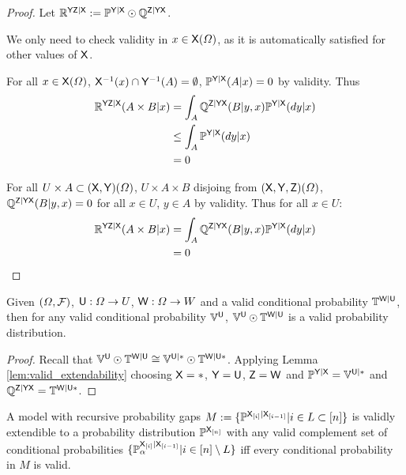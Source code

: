 \begin{proof}
Let $\mathbb{R}^{\mathsf{YZ}|\mathsf{X}}:=\mathbb{P}^{\mathsf{Y}|\mathsf{X}}\odot \mathbb{Q}^{\mathsf{Z}|\mathsf{Y}\mathsf{X}}$.

We only need to check validity in $x\in \mathsf{X}(\Omega)$, as it is automatically satisfied for other values of $\mathsf{X}$.

For all $x\in \mathsf{X}(\Omega)$, $\mathsf{X}^{-1}(x)\cap\mathsf{Y}^{-1}(A)=\emptyset$, $\mathbb{P}^{\mathsf{Y}|\mathsf{X}}(A|x)=0$ by validity. Thus
\begin{align}
	\mathbb{R}^{\mathsf{YZ}|\mathsf{X}}(A\times B|x) &= \int_A\mathbb{Q}^{\mathsf{Z}|\mathsf{YX}}(B|y,x)\mathbb{P}^{\mathsf{Y}|\mathsf{X}}(dy|x)\\
								  &\leq \int_A\mathbb{P}^{\mathsf{Y}|\mathsf{X}}(dy|x)\\
								  &=0
\end{align}

For all $U\times A\subset (\mathsf{X},\mathsf{Y})(\Omega)$, $U\times A\times B$ disjoing from $(\mathsf{X},\mathsf{Y},\mathsf{Z})(\Omega)$, $\mathbb{Q}^{\mathsf{Z}|\mathsf{YX}}(B|y,x)=0$ for all $x\in U$, $y\in A$ by validity. Thus for all $x\in U$:
\begin{align}
	\mathbb{R}^{\mathsf{YZ}|\mathsf{X}}(A\times B|x) &= \int_A\mathbb{Q}^{\mathsf{Z}|\mathsf{YX}}(B|y,x)\mathbb{P}^{\mathsf{Y}|\mathsf{X}}(dy|x)\\
								  &=0
\end{align}
\end{proof}

\begin{corollary}
Given $(\Omega,\mathcal{F})$, $\mathsf{U}:\Omega\to U$, $\mathsf{W}:\Omega\to W$ and a valid conditional probability $\mathbb{T}^{\mathsf{W}|\mathsf{U}}$, then for any valid conditional probability $\mathbb{V}^{\mathsf{U}}$, $\mathbb{V}^{\mathsf{U}}\odot \mathbb{T}^{\mathsf{W}|\mathsf{U}}$ is a valid probability distribution.
\end{corollary}

\begin{proof}
Recall that $\mathbb{V}^{\mathsf{U}}\odot \mathbb{T}^{\mathsf{W}|\mathsf{U}}\cong \mathbb{V}^{\mathsf{U}|*}\odot \mathbb{T}^{\mathsf{W}|\mathsf{U}*}$. Applying Lemma \ref{lem:valid_extendability} choosing $\mathsf{X}=*$, $\mathsf{Y}=\mathsf{U}$, $\mathsf{Z}=\mathsf{W}$ and $\mathbb{P}^{\mathsf{Y}|\mathsf{X}}=\mathbb{V}^{\mathsf{U}|*}$ and $\mathbb{Q}^{\mathsf{Z}|\mathsf{YX}}=\mathbb{T}^{\mathsf{W}|\mathsf{U*}}$.
\end{proof}


\begin{lemma}
A model with recursive probability gaps $M:=\{\mathbb{P}^{\mathsf{X}_{[i]}|\mathsf{X}_{[i-1]}}|i\in L\subset [n]\}$ is validly extendible to a probability distribution $\mathbb{P}^{\mathsf{X}_{[n]}}$ with any valid complement set of conditional probabilities $\{\mathbb{P}_\alpha^{\mathsf{X}_{[i]}|\mathsf{X}_{[i-1]}}|i\in [n]\setminus L\}$ iff every conditional probability in $M$ is valid.
\end{lemma}

